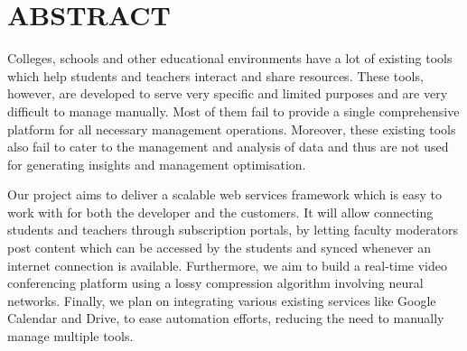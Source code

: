 \chapter*{ABSTRACT}

Colleges, schools and other educational environments have a lot of existing tools which help students and teachers interact and share resources. 
These tools, however, are developed to serve very specific and limited purposes and are very difficult to manage manually. 
Most of them fail to provide a single comprehensive platform for all necessary management operations. 
Moreover, these existing tools also fail to cater to the management and analysis of data and thus are not used for generating insights and management optimisation.

Our project aims to deliver a scalable web services framework which is easy to work with for both the developer and the customers. 
It will allow connecting students and teachers through subscription portals, by letting faculty moderators post content which can be accessed by the students and synced whenever an internet connection is available. 
Furthermore, we aim to build a real-time video conferencing platform using a lossy compression algorithm involving neural networks. 
Finally, we plan on integrating various existing services like Google Calendar and Drive, to ease automation efforts, reducing the need to manually manage multiple tools.
